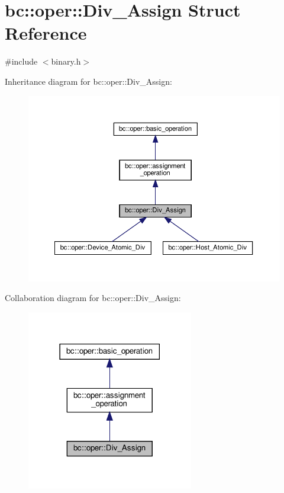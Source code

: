\hypertarget{structbc_1_1oper_1_1Div__Assign}{}\section{bc\+:\+:oper\+:\+:Div\+\_\+\+Assign Struct Reference}
\label{structbc_1_1oper_1_1Div__Assign}


{\ttfamily \#include $<$binary.\+h$>$}



Inheritance diagram for bc\+:\+:oper\+:\+:Div\+\_\+\+Assign\+:\nopagebreak
\begin{figure}[H]
\begin{center}
\leavevmode
\includegraphics[width=350pt]{structbc_1_1oper_1_1Div__Assign__inherit__graph}
\end{center}
\end{figure}


Collaboration diagram for bc\+:\+:oper\+:\+:Div\+\_\+\+Assign\+:\nopagebreak
\begin{figure}[H]
\begin{center}
\leavevmode
\includegraphics[width=206pt]{structbc_1_1oper_1_1Div__Assign__coll__graph}
\end{center}
\end{figure}
